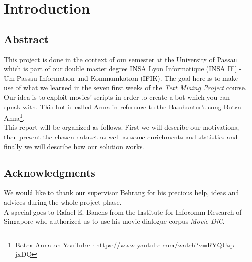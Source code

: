 \section{Introduction}
\subsection{Abstract}
This project is done in the context of our semester at the University of Passau which is part of our double master degree INSA Lyon Informatique (INSA IF) - Uni Passau Information und Kommunikation (IFIK).
The goal here is to make use of what we learned in the seven first weeks of the \textit{Text Mining Project} course.\\
Our idea is to exploit movies' scripts in order to create a bot which you can speak with. This bot is called Anna in reference to the Basshunter's song Boten Anna\footnote{Boten Anna on YouTube : https://www.youtube.com/watch?v=RYQUsp-jxDQ}. \\
This report will be organized as follows. First we will describe our motivations, then present the chosen dataset as well as some enrichments and statistics and finally we will describe how our solution works.
% 
\subsection{Acknowledgments}
We would like to thank our supervisor Behrang for his precious help, ideas and advices during the whole project phase.\\
A special  goes to Rafael E. Banchs from the Institute for Infocomm Research of Singapore who authorized us to use his movie dialogue corpus \textit{Movie-DiC}.